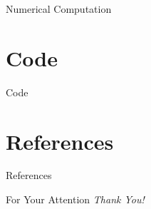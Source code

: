 \documentclass{beamer}
\begin{document}
\begin{frame}{Numerical Computation}
	
\end{frame}

\section{Code}

\begin{frame}[allowframebreaks]{Code}
	
\end{frame}

\section{References}
\begin{frame}[allowframebreaks]{References}
    \printbibliography
\end{frame}

\begin{frame}{For Your Attention}
    \centering
    \Large
    \emph{Thank You!}
\end{frame}
\end{document}
